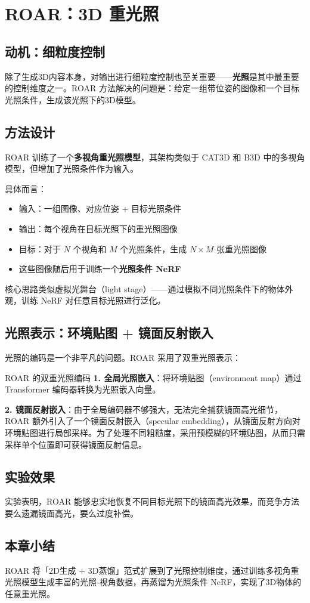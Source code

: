 \section{ROAR：3D 重光照}

\subsection{动机：细粒度控制}

除了生成3D内容本身，对输出进行细粒度控制也至关重要——\textbf{光照}是其中最重要的控制维度之一。ROAR 方法解决的问题是：给定一组带位姿的图像和一个目标光照条件，生成该光照下的3D模型。

\subsection{方法设计}

ROAR 训练了一个\textbf{多视角重光照模型}，其架构类似于 CAT3D 和 B3D 中的多视角模型，但增加了光照条件作为输入。

具体而言：
\begin{itemize}
    \item 输入：一组图像、对应位姿 + 目标光照条件
    \item 输出：每个视角在目标光照下的重光照图像
    \item 目标：对于 $N$ 个视角和 $M$ 个光照条件，生成 $N \times M$ 张重光照图像
    \item 这些图像随后用于训练一个\textbf{光照条件 NeRF}
\end{itemize}

核心思路类似虚拟光舞台（light stage）——通过模拟不同光照条件下的物体外观，训练 NeRF 对任意目标光照进行泛化。

\subsection{光照表示：环境贴图 + 镜面反射嵌入}

光照的编码是一个非平凡的问题。ROAR 采用了双重光照表示：

\begin{importantbox}{ROAR 的双重光照编码}
\textbf{1. 全局光照嵌入}：将环境贴图（environment map）通过 Transformer 编码器转换为光照嵌入向量。

\textbf{2. 镜面反射嵌入}：由于全局编码器不够强大，无法完全捕获镜面高光细节，ROAR 额外引入了一个镜面反射嵌入（specular embedding），从镜面反射方向对环境贴图进行局部采样。为了处理不同粗糙度，采用预模糊的环境贴图，从而只需采样单个位置即可获得镜面反射信息。
\end{importantbox}

\subsection{实验效果}

实验表明，ROAR 能够忠实地恢复不同目标光照下的镜面高光效果，而竞争方法要么遗漏镜面高光，要么过度补偿。

\subsection{本章小结}

ROAR 将「2D生成 + 3D蒸馏」范式扩展到了光照控制维度，通过训练多视角重光照模型生成丰富的光照-视角数据，再蒸馏为光照条件 NeRF，实现了3D物体的任意重光照。

